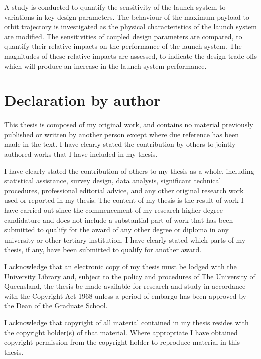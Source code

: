 A study is conducted to quantify the sensitivity of the launch system to variations in key design parameters. The behaviour of the maximum payload-to-orbit trajectory is investigated as the physical characteristics of the launch system are modified. 
The sensitivities of coupled design parameters are compared, to quantify their relative impacts on the performance of the launch system. The magnitudes of these relative impacts are assessed, to indicate the design trade-offs which will produce an increase in the launch system performance. 

 

\clearpage
\section*{Declaration by author}

  This thesis is composed of my original work, and contains no material previously published or written by another person except where due reference has been made in the text. I have clearly stated the contribution by others to jointly-authored works that I have included in my thesis.

  I have clearly stated the contribution of others to my thesis as a whole, including statistical assistance, survey design, data analysis, significant technical procedures, professional editorial advice, and any other original research work used or reported in my thesis. The content of my thesis is the result of work I have carried out since the commencement of my research higher degree candidature and does not include a substantial part of work that has been submitted to qualify for the award of any other degree or diploma in any university or other tertiary institution. I have clearly stated which parts of my thesis, if any, have been submitted to qualify for another award.

  I acknowledge that an electronic copy of my thesis must be lodged with the University Library and, subject to the policy and procedures of The University of Queensland, the thesis be made available for research and study in accordance with the Copyright Act 1968 unless a period of embargo has been approved by the Dean of the Graduate School.

  I acknowledge that copyright of all material contained in my thesis resides with the copyright holder(s) of that material. Where appropriate I have obtained copyright permission from the copyright holder to reproduce material in this thesis.

\clearpage
